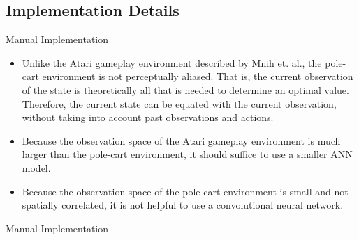 \documentclass[a4paper]{article}
\begin{document}
\subsection*{Implementation Details}
Manual Implementation
\begin{itemize}
    \item Unlike the Atari gameplay environment described by Mnih et. al., the
        pole-cart environment is not perceptually aliased. That is, the current
        observation of the state is theoretically all that is needed to
        determine an optimal value. Therefore, the current state can be equated
        with the current observation, without taking into account past
        observations and actions.
    \item Because the observation space of the Atari gameplay environment is
        much larger than the pole-cart environment, it should suffice to use a
        smaller ANN model.
    \item Because the observation space of the pole-cart environment is small
        and not spatially correlated, it is not helpful to use a convolutional
        neural network.
\end{itemize}
Manual Implementation
\end{document}
